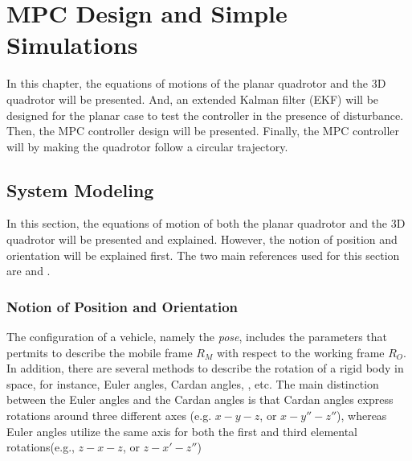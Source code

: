 \documentclass{thesisreport}
\begin{document}
 
\newpage 
 
%
 
\chapter{MPC Design and Simple Simulations}
In this chapter, the equations of motions of the planar quadrotor and the 3D quadrotor will be presented. And, an extended Kalman filter (EKF) will be designed for the planar case to test the controller in the presence of disturbance. Then, the MPC controller design will be presented. Finally, the MPC controller will by making the quadrotor follow a circular trajectory.

\section{System Modeling} 
In this section, the equations of motion of both the planar quadrotor and the 3D quadrotor will be presented and explained. However, the notion of position and orientation will be explained first. The two main references used for this section are \cite{Fantoni2016} and \cite{Erskine2021}. 

\subsection{Notion of Position and Orientation}

The configuration of a vehicle, namely the \textit{pose}, includes the parameters that pertmits to describe the mobile frame $R_M$ with respect to the working frame $R_O$. In addition, there are several methods to describe the rotation of a rigid body in space, for instance, Euler angles, Cardan angles, \cite{Goldstein1980}, etc. The main distinction between the Euler angles and the Cardan angles is that Cardan angles express rotations around three different axes (e.g. $x-y-z$, or $x-y'' -z''$), whereas Euler angles utilize the same axis for both the first and third elemental rotations(e.g., $z-x-z$, or $z-x'-z''$)
\end{document}
